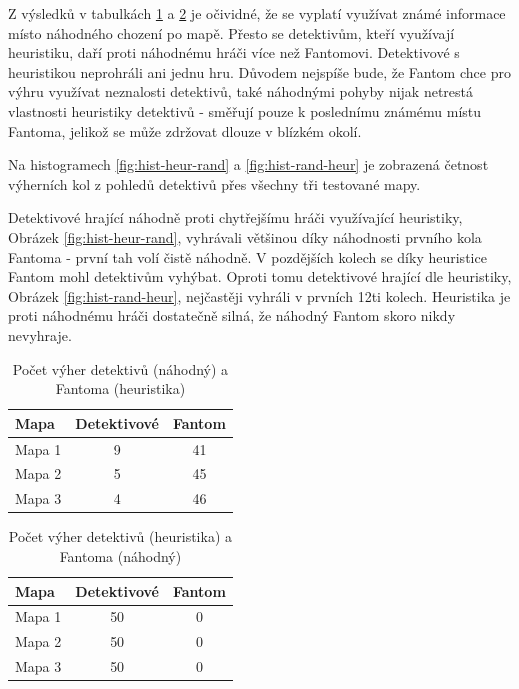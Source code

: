 Z výsledků v tabulkách \ref{tab:heur-rand} a \ref{tab:rand-heur} je očividné, že se vyplatí využívat známé informace místo náhodného chození po mapě. Přesto se detektivům, kteří využívají heuristiku, daří proti náhodnému hráči více než Fantomovi. Detektivové s heuristikou neprohráli ani jednu hru. Důvodem nejspíše bude, že Fantom chce pro výhru využívat neznalosti detektivů, také náhodnými pohyby nijak netrestá vlastnosti heuristiky detektivů - směřují pouze k poslednímu známému místu Fantoma, jelikož se může zdržovat dlouze v blízkém okolí.

Na histogramech \ref{fig:hist-heur-rand} a \ref{fig:hist-rand-heur} je zobrazená četnost výherních kol z pohledů detektivů přes všechny tři testované mapy. 

Detektivové hrající náhodně proti chytřejšímu hráči využívající heuristiky, Obrázek \ref{fig:hist-heur-rand}, vyhrávali většinou díky náhodnosti prvního kola Fantoma - první tah volí čistě náhodně. V pozdějších kolech se díky heuristice Fantom mohl detektivům vyhýbat. Oproti tomu detektivové hrající dle heuristiky, Obrázek \ref{fig:hist-rand-heur}, nejčastěji vyhráli v prvních 12ti kolech. Heuristika je proti náhodnému hráči dostatečně silná, že náhodný Fantom skoro nikdy nevyhraje.

\begin{table}[htbp]
    \centering
    \caption{Počet výher detektivů (náhodný) a Fantoma (heuristika)}
    \label{tab:heur-rand}
    \begin{tabular}{@{}lcc@{}}
        \toprule
        \textbf{Mapa} & \textbf{Detektivové} & \textbf{Fantom} \\
        \midrule
        Mapa 1 & 9 & 41 \\
        Mapa 2 & 5 & 45 \\
        Mapa 3 & 4 & 46 \\
        \bottomrule
    \end{tabular}
\end{table}

\begin{table}[htbp]
    \centering
    \caption{Počet výher detektivů (heuristika) a Fantoma (náhodný)}
    \label{tab:rand-heur}
    \begin{tabular}{@{}lcc@{}}
        \toprule
        \textbf{Mapa} & \textbf{Detektivové} & \textbf{Fantom} \\
        \midrule
        Mapa 1 & 50 & 0 \\
        Mapa 2 & 50 & 0 \\
        Mapa 3 & 50 & 0 \\
        \bottomrule
    \end{tabular}
\end{table}

